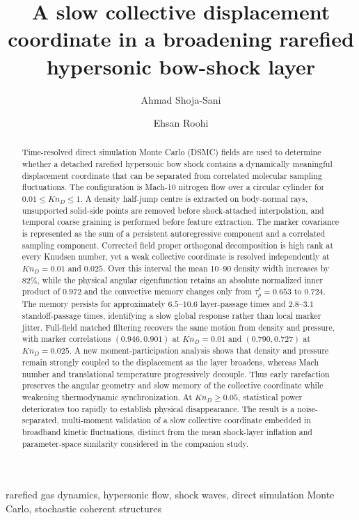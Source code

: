 \documentclass[paper]{JFM-FLM_Au}
\title{A slow collective displacement coordinate in a broadening rarefied hypersonic bow-shock layer}
\author{Ahmad Shoja-Sani\aff{1}\and Ehsan Roohi\aff{2}}
\affiliation{
\aff{1}Department of Mechanical Engineering, Ferdowsi University of Mashhad, Mashhad 9177948974, Iran
\aff{2}Department of Mechanical and Industrial Engineering, University of Massachusetts Amherst, 160 Governors Drive, Amherst, MA 01003, USA
}
\newcommand{\KnD}{Kn_D}
\begin{document}
\maketitle

\begin{abstract}
Time-resolved direct simulation Monte Carlo (DSMC) fields are used to determine whether a detached rarefied hypersonic bow shock contains a dynamically meaningful displacement coordinate that can be separated from correlated molecular sampling fluctuations. The configuration is Mach-10 nitrogen flow over a circular cylinder for $0.01\leq\KnD\leq1$. A density half-jump centre is extracted on body-normal rays, unsupported solid-side points are removed before shock-attached interpolation, and temporal coarse graining is performed before feature extraction. The marker covariance is represented as the sum of a persistent autoregressive component and a correlated sampling component. Corrected field proper orthogonal decomposition is high rank at every Knudsen number, yet a weak collective coordinate is resolved independently at $\KnD=0.01$ and $0.025$. Over this interval the mean 10--90 density width increases by $82\%$, while the physical angular eigenfunction retains an absolute normalized inner product of $0.972$ and the convective memory changes only from $\tau_p^*=0.653$ to $0.724$. The memory persists for approximately $6.5$--$10.6$ layer-passage times and $2.8$--$3.1$ standoff-passage times, identifying a slow global response rather than local marker jitter. Full-field matched filtering recovers the same motion from density and pressure, with marker correlations $(0.946,0.901)$ at $\KnD=0.01$ and $(0.790,0.727)$ at $\KnD=0.025$. A new moment-participation analysis shows that density and pressure remain strongly coupled to the displacement as the layer broadens, whereas Mach number and translational temperature progressively decouple. Thus early rarefaction preserves the angular geometry and slow memory of the collective coordinate while weakening thermodynamic synchronization. At $\KnD\geq0.05$, statistical power deteriorates too rapidly to establish physical disappearance. The result is a noise-separated, multi-moment validation of a slow collective coordinate embedded in broadband kinetic fluctuations, distinct from the mean shock-layer inflation and parameter-space similarity considered in the companion study.
\end{abstract}

\begin{keywords}
rarefied gas dynamics, hypersonic flow, shock waves, direct simulation Monte Carlo, stochastic coherent structures
\end{keywords}
\end{document}
